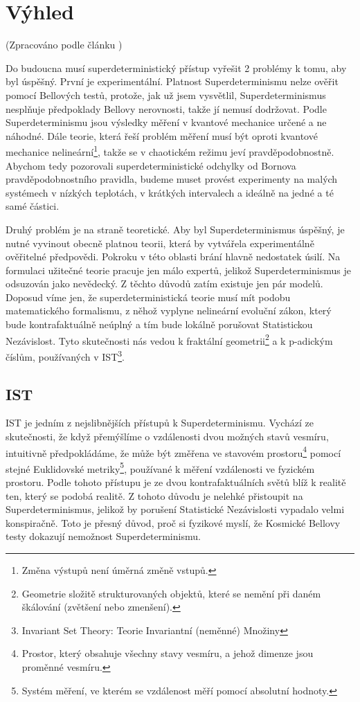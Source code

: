 \section{Výhled}
(Zpracováno podle článku \cite{supdet:rethink})

Do budoucna musí superdeterministický přístup vyřešit 2 problémy k tomu, aby byl úspěšný. První je experimentální. Platnost Superdeterminismu nelze ověřit pomocí Bellových testů, protože, jak už jsem vysvětlil, Superdeterminismus nesplňuje předpoklady Bellovy nerovnosti, takže jí nemusí dodržovat. Podle Superdeterminismu jsou výsledky měření v kvantové mechanice určené a ne náhodné. Dále teorie, která řeší problém měření musí být oproti kvantové mechanice nelineární\footnote[17]{Změna výstupů není úměrná změně vstupů.}, takže se v chaotickém režimu jeví pravděpodobnostně. Abychom tedy pozorovali superdeterministické odchylky od Bornova pravděpodobnostního pravidla, budeme muset provést experimenty na malých systémech v nízkých teplotách, v krátkých intervalech a ideálně na jedné a té samé částici. 

Druhý problém je na straně teoretické. Aby byl Superdeterminismus úspěšný, je nutné vyvinout obecně platnou teorii, která by vytvářela experimentálně ověřitelné předpovědi. Pokroku v této oblasti brání hlavně nedostatek úsilí. Na formulaci užitečné teorie pracuje jen málo expertů, jelikož Superdeterminismus je odsuzován jako nevědecký. Z těchto důvodů zatím existuje jen pár  modelů. Doposud víme jen, že superdeterministická teorie musí mít podobu matematického formalismu, z něhož vyplyne nelineární evoluční zákon, který bude kontrafaktuálně neúplný a tím bude lokálně porušovat Statistickou Nezávislost. Tyto skutečnosti nás vedou k fraktální geometrii\footnote[18]{Geometrie složitě strukturovaných objektů, které se nemění při daném škálování (zvětšení nebo zmenšení).} a k p-adickým číslům, používaných v IST\footnote[19]{Invariant Set Theory: Teorie Invariantní (neměnné) Množiny}. 

\subsection{IST}
IST je jedním z nejslibnějších přístupů k Superdeterminismu. Vychází ze skutečnosti, že když přemýšlíme o vzdálenosti dvou možných stavů vesmíru, intuitivně předpokládáme, že může být změřena ve stavovém prostoru\footnote[20]{Prostor, který obsahuje všechny stavy vesmíru, a jehož dimenze jsou proměnné vesmíru.} pomocí stejné Euklidovské metriky\footnote[21]{Systém měření, ve kterém se vzdálenost měří pomocí absolutní hodnoty.}, používané k měření vzdálenosti ve fyzickém prostoru. Podle tohoto přístupu je ze dvou kontrafaktuálních světů blíž k realitě ten, který se  podobá realitě. Z tohoto důvodu je nelehké přistoupit na Superdeterminismus, jelikož by porušení Statistické Nezávislosti vypadalo velmi konspiračně. Toto je přesný důvod, proč si fyzikové myslí, že Kosmické Bellovy testy dokazují nemožnost Superdeterminismu. 

